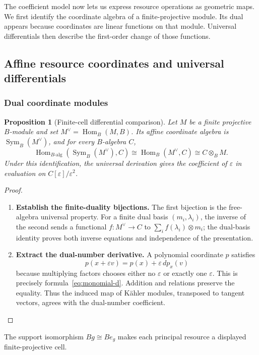 \documentclass[11pt,a4paper]{article}
\numberwithin{algorithm}{section}
\numberwithin{equation}{section}
\newtheorem{proposition}[proposition]{Proposition}
\theoremstyle{definition}
\theoremstyle{remark}
\theoremstyle{plain}
\newcommand{\eps}{\varepsilon}
\newcommand{\Sym}{\operatorname{Sym}}
\newcommand{\Hom}{\operatorname{Hom}}
\theoremstyle{definition}
\theoremstyle{plain}
\begin{document}
The coefficient model now lets us express resource operations as
geometric maps. We first identify the coordinate algebra of a
finite-projective module. Its dual appears because coordinates are
linear functions on that module. Universal differentials then
describe the first-order change of those functions.

\subsection{Affine resource coordinates and universal differentials}
\label{sec:geometry}

\subsubsection{Dual coordinate modules}
\begin{proposition}[Finite-cell differential comparison]\label{prop:dual-coordinates}
Let $M$ be a finite projective $B$-module and set $M^\vee=\Hom_B(M,B)$. Its affine coordinate algebra is $\Sym_B(M^\vee)$, and for every $B$-algebra $C$,
\[
 \Hom_{B\text{-alg}}(\Sym_B(M^\vee),C)
 \cong\Hom_B(M^\vee,C)\cong C\otimes_BM.
\]
Under this identification, the universal derivation gives the coefficient of $\eps$ in evaluation on $C[\eps]/\eps^2$.
\end{proposition}
\begin{proof}\leavevmode
\begin{enumerate}[leftmargin=*,align=left]
\item \textbf{Establish the finite-duality bijections.}
The first bijection is the free-algebra universal property. For a finite dual basis $(m_i,\lambda_i)$, the inverse of the second sends a functional $f:M^\vee\to C$ to $\sum_i f(\lambda_i)\otimes m_i$; the dual-basis identity proves both inverse equations and independence of the presentation.

\item \textbf{Extract the dual-number derivative.}
A polynomial coordinate $p$ satisfies
\[
 p(x+\eps v)=p(x)+\eps\,dp_x(v)
\]
because multiplying factors chooses either no $\eps$ or exactly one $\eps$. This is precisely formula~\eqref{eq:monomial-d}. Addition and relations preserve the equality. Thus the induced map of K\"ahler modules, transposed to tangent vectors, agrees with the dual-number coefficient.
\end{enumerate}
\end{proof}

The support isomorphism $Bg\cong Be_g$ makes each principal
resource a displayed finite-projective cell.
\end{document}
